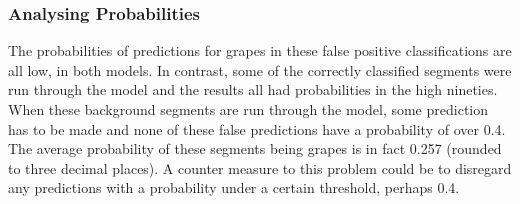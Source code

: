 \subsubsection*{Analysing Probabilities}
The probabilities of predictions for grapes in these false positive classifications are all low, in both models.
In contrast, some of the correctly classified segments were run through the model and the results all had probabilities in the high nineties.
When these background segments are run through the model, some prediction has to be made and none of these false predictions have a probability of over 0.4.
The average probability of these segments being grapes is in fact 0.257 (rounded to three decimal places).
A counter measure to this problem could be to disregard any predictions with a probability under a certain threshold, perhaps 0.4.

